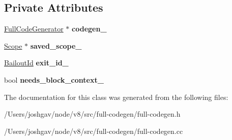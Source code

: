 \subsection*{Private Attributes}
\begin{DoxyCompactItemize}
\item 
\hyperlink{classv8_1_1internal_1_1_full_code_generator}{Full\+Code\+Generator} $\ast$ {\bfseries codegen\+\_\+}\hypertarget{classv8_1_1internal_1_1_full_code_generator_1_1_enter_block_scope_if_needed_a92dc4846484b10c10a82f2285347117f}{}\label{classv8_1_1internal_1_1_full_code_generator_1_1_enter_block_scope_if_needed_a92dc4846484b10c10a82f2285347117f}

\item 
\hyperlink{classv8_1_1internal_1_1_scope}{Scope} $\ast$ {\bfseries saved\+\_\+scope\+\_\+}\hypertarget{classv8_1_1internal_1_1_full_code_generator_1_1_enter_block_scope_if_needed_a41b7526211dd7500c2bf18396240c30c}{}\label{classv8_1_1internal_1_1_full_code_generator_1_1_enter_block_scope_if_needed_a41b7526211dd7500c2bf18396240c30c}

\item 
\hyperlink{classv8_1_1internal_1_1_bailout_id}{Bailout\+Id} {\bfseries exit\+\_\+id\+\_\+}\hypertarget{classv8_1_1internal_1_1_full_code_generator_1_1_enter_block_scope_if_needed_a1e788b4ada3a6ac4021daa5528e8dc9e}{}\label{classv8_1_1internal_1_1_full_code_generator_1_1_enter_block_scope_if_needed_a1e788b4ada3a6ac4021daa5528e8dc9e}

\item 
bool {\bfseries needs\+\_\+block\+\_\+context\+\_\+}\hypertarget{classv8_1_1internal_1_1_full_code_generator_1_1_enter_block_scope_if_needed_a98e43e41370d71388a596aa659df19f2}{}\label{classv8_1_1internal_1_1_full_code_generator_1_1_enter_block_scope_if_needed_a98e43e41370d71388a596aa659df19f2}

\end{DoxyCompactItemize}


The documentation for this class was generated from the following files\+:\begin{DoxyCompactItemize}
\item 
/\+Users/joshgav/node/v8/src/full-\/codegen/full-\/codegen.\+h\item 
/\+Users/joshgav/node/v8/src/full-\/codegen/full-\/codegen.\+cc\end{DoxyCompactItemize}
